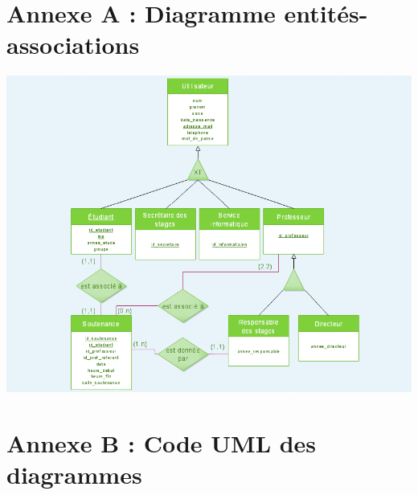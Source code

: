 \documentclass[11pt, a4paper]{report}
\begin{document}
\chapter*{Annexe A : Diagramme entités-associations}
\begin{center}
\includegraphics[scale=0.5]{Images/diagentiassoc.png}
\end{center}


\chapter*{Annexe B : Code UML des diagrammes}
\end{document}
